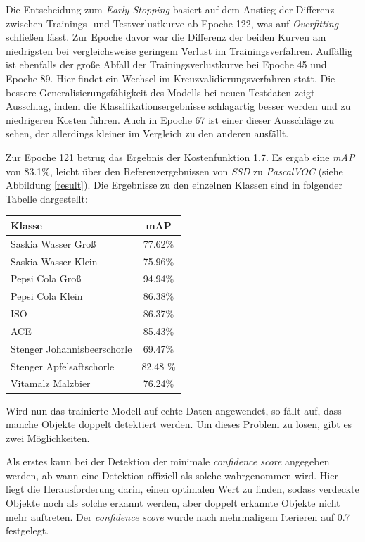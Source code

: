 Die Entscheidung zum \textit{Early Stopping} basiert auf dem Anstieg der Differenz zwischen Trainings- und Testverlustkurve ab Epoche 122, was auf \textit{Overfitting} schließen lässt. Zur Epoche davor war die Differenz der beiden Kurven am niedrigsten bei vergleichsweise geringem Verlust im Trainingsverfahren. Auffällig ist ebenfalls der große Abfall der Trainingsverlustkurve bei Epoche 45 und Epoche 89. Hier findet ein Wechsel im Kreuzvalidierungsverfahren statt. Die bessere Generalisierungsfähigkeit des Modells bei neuen Testdaten zeigt Ausschlag, indem die Klassifikationsergebnisse schlagartig besser werden und zu niedrigeren Kosten führen. Auch in Epoche 67 ist einer dieser Ausschläge zu sehen, der allerdings kleiner im Vergleich zu den anderen ausfällt. 

Zur Epoche 121 betrug das Ergebnis der Kostenfunktion 1.7. Es ergab eine \textit{mAP} von 83.1\%, leicht über den Referenzergebnissen von \textit{SSD} zu \textit{PascalVOC} (siehe Abbildung \ref{result}). Die Ergebnisse zu den einzelnen Klassen sind in folgender Tabelle dargestellt:

\begin{center}
	\begin{tabular}[H]{l|c}
		Klasse & mAP \\
		\hline
		Saskia Wasser Groß & 77.62\% \\
		Saskia Wasser Klein & 75.96\% \\
		Pepsi Cola Groß & 94.94\% \\
		Pepsi Cola Klein & 86.38\% \\
		ISO & 86.37\% \\
		ACE & 85.43\% \\
		Stenger Johannisbeerschorle & 69.47\% \\
		Stenger Apfelsaftschorle & 82.48 \% \\
		Vitamalz Malzbier & 76.24\%
	\end{tabular}
	\label{table:ssdresults}
\end{center}

Wird nun das trainierte Modell auf echte Daten angewendet, so fällt auf, dass manche Objekte doppelt detektiert werden. Um dieses Problem zu lösen, gibt es zwei Möglichkeiten. 

Als erstes kann bei der Detektion der minimale \textit{confidence score} angegeben werden, ab wann eine Detektion offiziell als solche wahrgenommen wird. Hier liegt die Herausforderung darin, einen optimalen Wert zu finden, sodass verdeckte Objekte noch als solche erkannt werden, aber doppelt erkannte Objekte nicht mehr auftreten. Der \textit{confidence score} wurde nach mehrmaligem Iterieren auf 0.7 festgelegt.

